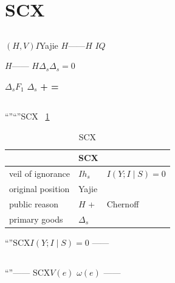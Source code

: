 \documentclass[11pt,a4paper]{article}
\theoremstyle{remark}
\begin{document}
\section{SCX}

\subsection{}



\begin{description}[leftmargin=1.5cm]
    \item[\textbf{} $\to$ \textbf{}] 
          $(H, V)$$I$Yajie
          $H$——$H$\textbf{}
          $I$$Q$

    \item[\textbf{} $\to$ \textbf{}] 
          $H$——
          $H$$\Delta_s$$\Delta_s = 0$
          

    \item[\textbf{} $\to$ \textbf{}] 
          $\Delta_s$$F_1$
          $\Delta_s$
          \textbf{ +  = }
\end{description}

\subsection{}

\cite{rawls1971theory}
``''``''SCX
\textbf{}~\ref{tab:rawls}

\begin{table}[htbp]
\centering
\caption{SCX}
\label{tab:rawls}
\begin{tabular}{@{}lll@{}}
\toprule
\textbf{} & \textbf{SCX} & \textbf{} \\
\midrule
veil of ignorance & $I$$h_s$ & $I(Y; I \mid S) = 0$ \\
original position & Yajie &  \\
public reason & $H$ +  & Chernoff \\
primary goods & $\Delta_s$ &  \\
\bottomrule
\end{tabular}
\end{table}

\textbf{}
``''SCX$I(Y; I \mid S) = 0$
\textbf{}——


\subsection{}

\textbf{}\cite{bentham1827rationale}
``''——
SCX\textbf{}$V(e)$
\textbf{}$\omega(e)$
——
\end{document}
